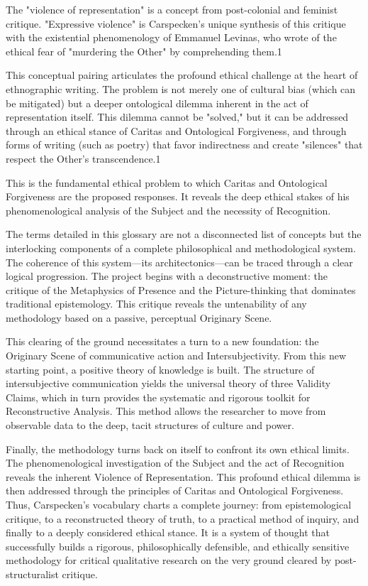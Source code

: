 \documentclass{book}
\begin{document}
The "violence of representation" is a concept from post-colonial and feminist critique. "Expressive violence" is Carspecken's unique synthesis of this critique with the existential phenomenology of Emmanuel Levinas, who wrote of the ethical fear of "murdering the Other" by comprehending them.1

This conceptual pairing articulates the profound ethical challenge at the heart of ethnographic writing. The problem is not merely one of cultural bias (which can be mitigated) but a deeper ontological dilemma inherent in the act of representation itself. This dilemma cannot be "solved," but it can be addressed through an ethical stance of Caritas and Ontological Forgiveness, and through forms of writing (such as poetry) that favor indirectness and create "silences" that respect the Other's transcendence.1

This is the fundamental ethical problem to which Caritas and Ontological Forgiveness are the proposed responses. It reveals the deep ethical stakes of his phenomenological analysis of the Subject and the necessity of Recognition.

\parencite{HenzeCarspecken2018}
The terms detailed in this glossary are not a disconnected list of concepts but the interlocking components of a complete philosophical and methodological system. The coherence of this system—its architectonics—can be traced through a clear logical progression. The project begins with a deconstructive moment: the critique of the Metaphysics of Presence and the Picture-thinking that dominates traditional epistemology. This critique reveals the untenability of any methodology based on a passive, perceptual Originary Scene.

This clearing of the ground necessitates a turn to a new foundation: the Originary Scene of communicative action and Intersubjectivity. From this new starting point, a positive theory of knowledge is built. The structure of intersubjective communication yields the universal theory of three Validity Claims, which in turn provides the systematic and rigorous toolkit for Reconstructive Analysis. This method allows the researcher to move from observable data to the deep, tacit structures of culture and power.

Finally, the methodology turns back on itself to confront its own ethical limits. The phenomenological investigation of the Subject and the act of Recognition reveals the inherent Violence of Representation. This profound ethical dilemma is then addressed through the principles of Caritas and Ontological Forgiveness. Thus, Carspecken's vocabulary charts a complete journey: from epistemological critique, to a reconstructed theory of truth, to a practical method of inquiry, and finally to a deeply considered ethical stance. It is a system of thought that successfully builds a rigorous, philosophically defensible, and ethically sensitive methodology for critical qualitative research on the very ground cleared by post-structuralist critique.
\end{document}
